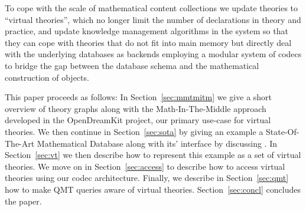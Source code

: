 To cope with the scale of mathematical content collections we update \ommt theories to ``virtual theories'', which no longer limit the number of declarations in theory and practice, and update knowledge management algorithms in the \mmt system so that they can cope with theories that do not fit into main memory but directly deal with the underlying databases as backends employing a modular system of codecs to bridge the gap between the database schema and the mathematical construction of objects.

This paper proceeds as follows: 
In Section~\ref{sec:mmtmitm} we give a short overview of \ommt theory graphs along with the Math-In-The-Middle approach developed in the \textsf{OpenDreamKit} project, our primary use-case for virtual theories. 
We then continue in Section~\ref{sec:sota} by giving an example a State-Of-The-Art Mathematical Database along with its' interface by discussing \lmfdb. 
In Section~\ref{sec:vt} we then describe how to represent this example as a set of virtual theories. 
We move on in Section~\ref{sec:access} to describe how to access virtual theories using our codec architecture. 
Finally, we describe in Section~\ref{sec:qmt} how to make QMT queries aware of virtual theories. 
Section~\ref{sec:concl} concludes the paper.


